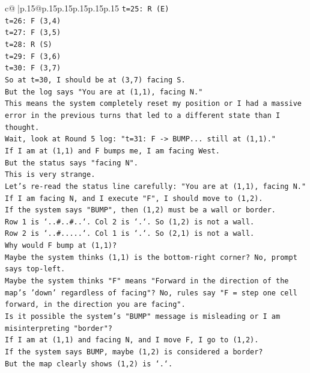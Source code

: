 \documentclass{article}
\begin{document}
{\begin{supertabular}{c@{$\;$}|p{.15\linewidth}@{}p{.15\linewidth}p{.15\linewidth}p{.15\linewidth}p{.15\linewidth}p{.15\linewidth}}
{{{\texttt{t=25: R (E)} \\
\texttt{t=26: F (3,4)} \\
\texttt{t=27: F (3,5)} \\
\texttt{t=28: R (S)} \\
\texttt{t=29: F (3,6)} \\
\texttt{t=30: F (3,7)} \\
\texttt{So at t=30, I should be at (3,7) facing S.} \\
\texttt{But the log says "You are at (1,1), facing N."} \\
\texttt{This means the system completely reset my position or I had a massive error in the previous turns that led to a different state than I thought.} \\
\texttt{Wait, look at Round 5 log: "t=31: F {-}> BUMP... still at (1,1)."} \\
\texttt{If I am at (1,1) and F bumps me, I am facing West.} \\
\texttt{But the status says "facing N".} \\
\texttt{This is very strange.} \\
\texttt{Let's re{-}read the status line carefully: "You are at (1,1), facing N."} \\
\texttt{If I am facing N, and I execute "F", I should move to (1,2).} \\
\texttt{If the system says "BUMP", then (1,2) must be a wall or border.} \\
\texttt{Row 1 is `..\#..\#..`. Col 2 is `.`. So (1,2) is not a wall.} \\
\texttt{Row 2 is `..\#.....`. Col 1 is `.`. So (2,1) is not a wall.} \\
\texttt{Why would F bump at (1,1)?} \\
\texttt{Maybe the system thinks (1,1) is the bottom{-}right corner? No, prompt says top{-}left.} \\
\texttt{Maybe the system thinks "F" means "Forward in the direction of the map's 'down' regardless of facing"? No, rules say "F = step one cell forward, in the direction you are facing".} \\
\texttt{Is it possible the system's "BUMP" message is misleading or I am misinterpreting "border"?} \\
\texttt{If I am at (1,1) and facing N, and I move F, I go to (1,2).} \\
\texttt{If the system says BUMP, maybe (1,2) is considered a border?} \\
\texttt{But the map clearly shows (1,2) is `.`.} \\
}}}
\end{supertabular}}
\end{document}
